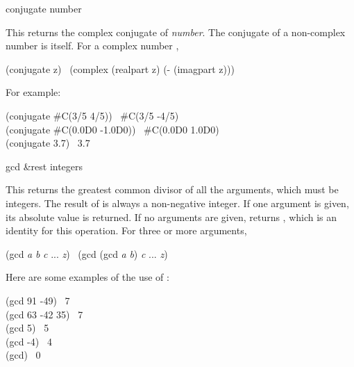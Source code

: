 \begin{defun}[Function]
conjugate number

This returns the complex conjugate of \emph{number}.  The conjugate
of a non-complex number is itself.  For a complex number ,
\begin{lisp}
(conjugate z) \EQ\ (complex (realpart z) (- (imagpart z)))
\end{lisp}
For example:
\begin{lisp}
(conjugate \#C(3/5 4/5)) \EV\ \#C(3/5 -4/5) \\
(conjugate \#C(0.0D0 -1.0D0)) \EV\ \#C(0.0D0 1.0D0) \\
(conjugate 3.7) \EV\ 3.7
\end{lisp}
\end{defun}

\begin{defun}[Function]
gcd &rest integers

This returns the greatest common divisor of all the arguments,
which must be integers.  The result of  is always a non-negative
integer.
If one argument is given, its absolute value is returned.
If no arguments are given,  returns ,
which is an identity for this operation.
For three or more arguments,
\begin{lisp}
(gcd \emph{a} \emph{b} \emph{c} ... \emph{z}) \EQ\ (gcd (gcd \emph{a} \emph{b}) \emph{c} ... \emph{z})
\end{lisp}

Here are some examples of the use of :
\begin{lisp}
(gcd 91 -49) \EV\ 7 \\
(gcd 63 -42 35) \EV\ 7 \\
(gcd 5) \EV\ 5 \\
(gcd -4) \EV\ 4 \\
(gcd) \EV\ 0
\end{lisp}
\end{defun}

